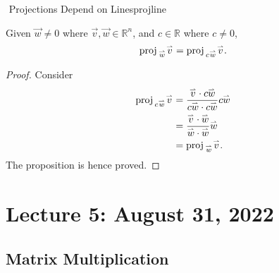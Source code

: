         \begin{theorem}{\Stop\,\,Projections Depend on Lines}{projline}
        
            Given \(\vec{w}\neq0\) where \(\vec{v},\vec{w}\in\mathbb{R}^n\), and \(c\in\mathbb{R}\) where \(c\neq0\),
            \begin{equation*}
                \proj_{\vec{w}}\vec{v}=\proj_{c\vec{w}}\vec{v}.
            \end{equation*}
            \begin{proof}
                Consider
                \begin{align*}
                    \proj_{c\vec{w}}\vec{v}&=\frac{\vec{v}\cdot c\vec{w}}{c\vec{w}\cdot c\vec{w}}c\vec{w} \\
                    &=\frac{\vec{v}\cdot \vec{w}}{\vec{w}\cdot \vec{w}}\vec{w} \\
                    &=\proj_{\vec{w}}\vec{v}.
                \end{align*}
                The proposition is hence proved.
            \end{proof}
        
        \end{theorem}
    
\pagebreak

\section{Lecture 5: August 31, 2022}
        
    \subsection{Matrix Multiplication}
    
